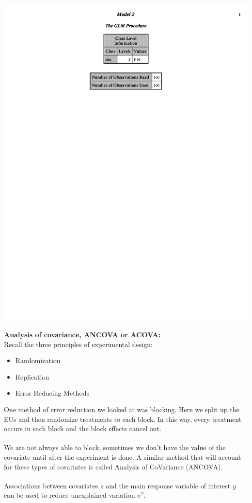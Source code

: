 \begin{center}
\includegraphics[scale=0.8,trim= 5mm 5mm 5mm 5mm,page=15]{ResRunGLM.pdf}
\end{center}

\newpage

\textbf{Analysis of covariance, ANCOVA or ACOVA:}\\
Recall the three principles of experimental design:
\begin{itemize}
\item Randomization
\item Replication
\item Error Reducing Methods
\end{itemize}

One method of error reduction we looked at was blocking.  Here we split up the EUs and then randomize treatments to each block.  In this way, every treatment occurs in each block and the block effects cancel out.\\~\\
We are not always able to block, sometimes we don't have the value of the covariate until after the experiment is done.  A similar method that will account for these types of covariates is called Analysis of CoVariance (ANCOVA).\\~\\
Associations between covariates $z$ and the main response variable of interest $y$ can be used to reduce unexplained variation $\sigma^2$.\\~\\

